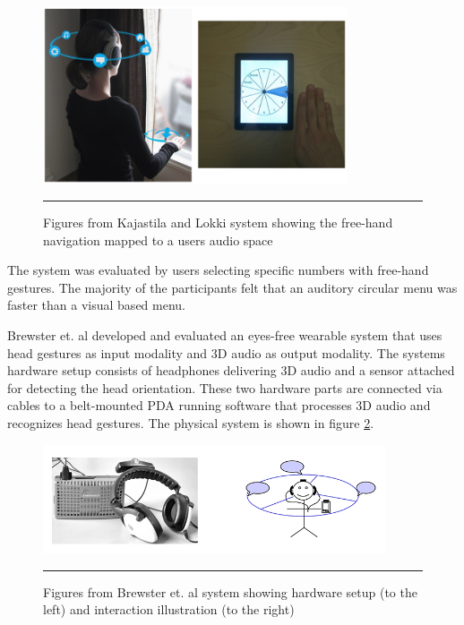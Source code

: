 \begin{figure}[htbp]
	\centering
		\includegraphics[width=0.8\textwidth,height=\textheight,keepaspectratio]{./Figures/kajastila-system.png}
		\rule{35em}{0.5pt}
	\caption[Pirhonen system]{Figures from Kajastila and Lokki \cite{kajastila_interaction_2013} system showing the free-hand navigation mapped to a users audio space}
	\label{fig:kajastila}
\end{figure}

The system was evaluated by users selecting specific numbers with free-hand gestures. The majority of the participants felt that an auditory circular menu was faster than a visual based menu.


Brewster et. al \cite{brewster_multimodaleyes-freeinteraction_2003} developed and evaluated an eyes-free wearable system that uses head gestures as input modality and 3D audio as output modality. The systems hardware setup consists of headphones delivering 3D audio and a sensor attached for detecting the head orientation. These two hardware parts are connected via cables to a belt-mounted PDA running software that processes 3D audio and recognizes head gestures. The physical system is shown in figure \ref{fig:brewster}.

\begin{figure}[htbp]
	\centering
		\includegraphics[width=0.9\textwidth,height=\textheight,keepaspectratio]{./Figures/brewster-system.png}
		\rule{35em}{0.5pt}
	\caption[Brewster system]{Figures from Brewster et. al \cite{brewster_multimodaleyes-freeinteraction_2003} system showing hardware setup (to the left) and interaction illustration (to the right)}
	\label{fig:brewster}
\end{figure}

